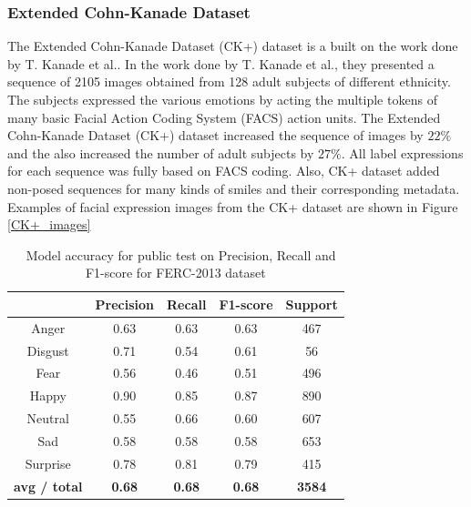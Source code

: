 \documentclass[master]{thesis-uestc}
\begin{document}
\subsubsection{Extended Cohn-Kanade Dataset}
The Extended Cohn-Kanade Dataset (CK+) dataset is a built on the work done by T. Kanade et al.\cite{ck_840611}. In the work done by T. Kanade et al.\cite{ck_840611}, they presented a sequence of 2105 images obtained from 128 adult subjects of different ethnicity. The subjects expressed the various emotions by acting the multiple tokens of many basic Facial Action Coding System (FACS)\cite{ekman_facs} action units. The Extended Cohn-Kanade Dataset (CK+) dataset increased the sequence of images by $22\%$ and the also increased the number of adult subjects by $27\%$. All label expressions for each sequence was fully based on FACS coding. Also, CK+ dataset added non-posed sequences for many kinds of smiles and their corresponding metadata. Examples of facial expression images from the CK+ dataset are shown in Figure \ref{CK+_images}

\begin{table}[ht]
\renewcommand{\arraystretch}{1.3}
\caption{\,\,\,\,\,Model accuracy for public test on Precision, Recall and F1-score for FERC-2013 dataset}
\label{table_fer2013_scores_public}
\begin{center}
\begin{tabular}{|c|c|c|c|c|}

\hline
 & Precision & Recall & F1-score & Support\\ \hline

Anger & 0.63 & 0.63 & 0.63 & 467\\ \hline
Disgust & 0.71 & 0.54 & 0.61 & 56\\ \hline
Fear & 0.56 & 0.46 & 0.51 & 496\\ \hline
Happy & 0.90 & 0.85 & 0.87 & 890\\ \hline
Neutral & 0.55 & 0.66 & 0.60 & 607\\ \hline
Sad & 0.58 & 0.58 & 0.58 & 653\\ \hline
Surprise & 0.78 & 0.81 & 0.79 & 415\\ \hline

\textbf{avg / total} & \textbf{0.68} & \textbf{0.68} & \textbf{0.68} & \textbf{3584}\\ \hline

\end{tabular}
\end{center}
\end{table}
\end{document}
